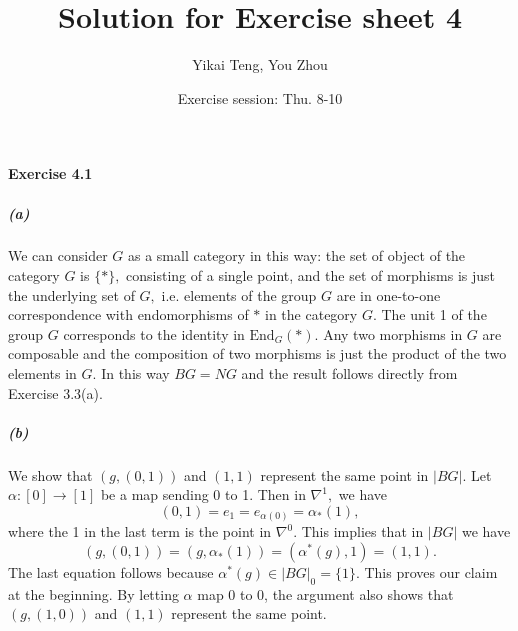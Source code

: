\documentclass{article}
\title{Solution for Exercise sheet 4}
\author{Yikai Teng, You Zhou}
\date{Exercise session: Thu. 8-10}
\begin{document}
\maketitle
\paragraph{Exercise 4.1}
\subparagraph{(a)}We can consider $G$ as a small category in this way: the set of object of the category $G$ is $\{*\},$ consisting of a single point, and the set of morphisms is just the underlying set of $G,$ i.e. elements of the group $G$ are in one-to-one correspondence with endomorphisms of $*$ in the category $G.$ The unit 1 of the group $G$ corresponds to the identity in $\text{End}_{G}(*).$ Any two morphisms in $G$ are composable and the composition of two morphisms is just the product of the two elements in $G.$ In this way $BG=NG$ and the result follows directly from Exercise 3.3(a).

\subparagraph{(b)}We show that $(g,(0,1))$ and $(1,1)$ represent the same point in $|BG|.$ Let $\alpha\colon[0]\rightarrow[1]$ be a map sending 0 to 1. Then in $\nabla^1,$ we have
\[(0,1)=e_1=e_{\alpha(0)}=\alpha_*(1),\]
where the 1 in the last term is the point in $\nabla^0.$ This implies that in $|BG|$ we have
\[(g,(0,1))=(g,\alpha_*(1))=(\alpha^*(g),1)=(1,1).\]
The last equation follows because $\alpha^*(g)\in |BG|_0=\{1\}.$ This proves our claim at the beginning. By letting $\alpha$ map 0 to 0, the argument also shows that $(g,(1,0))$ and $(1,1)$ represent the same point.
\end{document}
